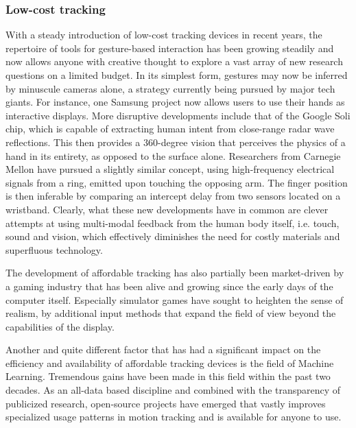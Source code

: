 \subsubsection{Low-cost tracking}

With a steady introduction of low-cost tracking devices in recent years, the repertoire of tools for gesture-based interaction has been growing steadily and now allows anyone with creative thought to explore a vast array of new research questions on a limited budget. In its simplest form, gestures may now be inferred by minuscule cameras alone, a strategy currently being pursued by major tech giants. For instance, one Samsung project now allows users to use their hands as interactive displays\cite{SamsungProjectWatch}. More disruptive developments include that of the Google Soli chip, which is capable of extracting human intent from close-range radar wave reflections. This then provides a 360-degree vision that perceives the physics of a hand in its entirety, as opposed to the surface alone. Researchers from Carnegie Mellon have pursued a slightly similar concept\cite{SkinTrack}, using high-frequency electrical signals from a ring, emitted upon touching the opposing arm. The finger position is then inferable by comparing an intercept delay from two sensors located on a wristband. Clearly, what these new developments have in common are clever attempts at using multi-modal feedback from the human body itself, i.e. touch, sound and vision, which effectively diminishes the need for costly materials and superfluous technology.%


The development of affordable tracking has also partially been market-driven by a gaming industry that has been alive and growing since the early days of the computer itself. Especially simulator games have sought to heighten the sense of realism, by additional input methods that expand the field of view beyond the capabilities of the display.

Another and quite different factor that has had a significant impact on the efficiency and availability of affordable tracking devices is the field of Machine Learning. Tremendous gains have been made in this field within the past two decades. As an all-data based discipline and combined with the transparency of publicized research, open-source projects have emerged that vastly improves specialized usage patterns in motion tracking and is available for anyone to use.

